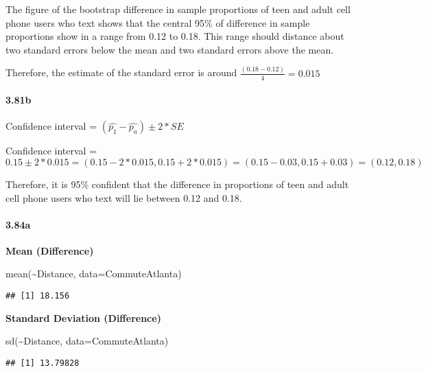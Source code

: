 \documentclass[
]{article}
\newenvironment{Shaded}{\begin{snugshade}}{\end{snugshade}}
\newcommand{\AttributeTok}[1]{\textcolor[rgb]{0.77,0.63,0.00}{#1}}
\newcommand{\FunctionTok}[1]{\textcolor[rgb]{0.00,0.00,0.00}{#1}}
\newcommand{\NormalTok}[1]{#1}
\newcommand{\SpecialCharTok}[1]{\textcolor[rgb]{0.00,0.00,0.00}{#1}}
\begin{document}
The figure of the bootstrap difference in sample proportions of teen and
adult cell phone users who text shows that the central 95\% of
difference in sample proportions show in a range from 0.12 to 0.18. This
range should distance about two standard errors below the mean and two
standard errors above the mean.

Therefore, the estimate of the standard error is around
\(\frac{(0.18-0.12)}{4}= 0.015\)

\hypertarget{b-11}{%
\paragraph{3.81b}\label{b-11}}

Confidence interval = \((\hat{p_1} - \hat{p_a}) \pm 2 *SE\)

Confidence interval =
\(0.15\pm 2*0.015 =(0.15-2 * 0.015,0.15+2 * 0.015) =(0.15-0.03,0.15 + 0.03) = (0.12,0.18)\)

Therefore, it is 95\% confident that the difference in proportions of
teen and adult cell phone users who text will lie between 0.12 and 0.18.

\hypertarget{a-12}{%
\paragraph{3.84a}\label{a-12}}

\textbf{Mean (Difference)}

\begin{Shaded}
\begin{Highlighting}[]
\FunctionTok{mean}\NormalTok{(}\SpecialCharTok{\textasciitilde{}}\NormalTok{Distance, }\AttributeTok{data=}\NormalTok{CommuteAtlanta)}
\end{Highlighting}
\end{Shaded}

\begin{verbatim}
## [1] 18.156
\end{verbatim}

\textbf{Standard Deviation (Difference)}

\begin{Shaded}
\begin{Highlighting}[]
\FunctionTok{sd}\NormalTok{(}\SpecialCharTok{\textasciitilde{}}\NormalTok{Distance, }\AttributeTok{data=}\NormalTok{CommuteAtlanta)}
\end{Highlighting}
\end{Shaded}

\begin{verbatim}
## [1] 13.79828
\end{verbatim}
\end{document}
